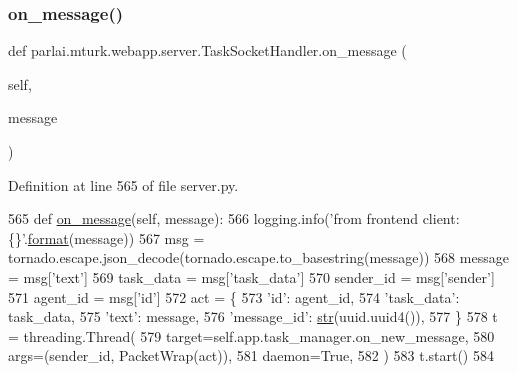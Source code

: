 \subsubsection{\texorpdfstring{on\+\_\+message()}{on\_message()}}
{\footnotesize\ttfamily def parlai.\+mturk.\+webapp.\+server.\+Task\+Socket\+Handler.\+on\+\_\+message (\begin{DoxyParamCaption}\item[{}]{self,  }\item[{}]{message }\end{DoxyParamCaption})}



Definition at line 565 of file server.\+py.


\begin{DoxyCode}
565     \textcolor{keyword}{def }\hyperlink{namespaceparlai_1_1chat__service_1_1services_1_1terminal__chat_1_1client_a0ef2bb2bd3b966dcdd8402a92b999708}{on\_message}(self, message):
566         logging.info(\textcolor{stringliteral}{'from frontend client: \{\}'}.\hyperlink{namespaceparlai_1_1chat__service_1_1services_1_1messenger_1_1shared__utils_a32e2e2022b824fbaf80c747160b52a76}{format}(message))
567         msg = tornado.escape.json\_decode(tornado.escape.to\_basestring(message))
568         message = msg[\textcolor{stringliteral}{'text'}]
569         task\_data = msg[\textcolor{stringliteral}{'task\_data'}]
570         sender\_id = msg[\textcolor{stringliteral}{'sender'}]
571         agent\_id = msg[\textcolor{stringliteral}{'id'}]
572         act = \{
573             \textcolor{stringliteral}{'id'}: agent\_id,
574             \textcolor{stringliteral}{'task\_data'}: task\_data,
575             \textcolor{stringliteral}{'text'}: message,
576             \textcolor{stringliteral}{'message\_id'}: \hyperlink{namespacegenerate__task__READMEs_a5b88452ffb87b78c8c85ececebafc09f}{str}(uuid.uuid4()),
577         \}
578         t = threading.Thread(
579             target=self.app.task\_manager.on\_new\_message,
580             args=(sender\_id, PacketWrap(act)),
581             daemon=\textcolor{keyword}{True},
582         )
583         t.start()
584 
\end{DoxyCode}
\mbox{\label{classparlai_1_1mturk_1_1webapp_1_1server_1_1TaskSocketHandler_adb3510933e76ec5d4f7ac2d1dd52962f}} 
